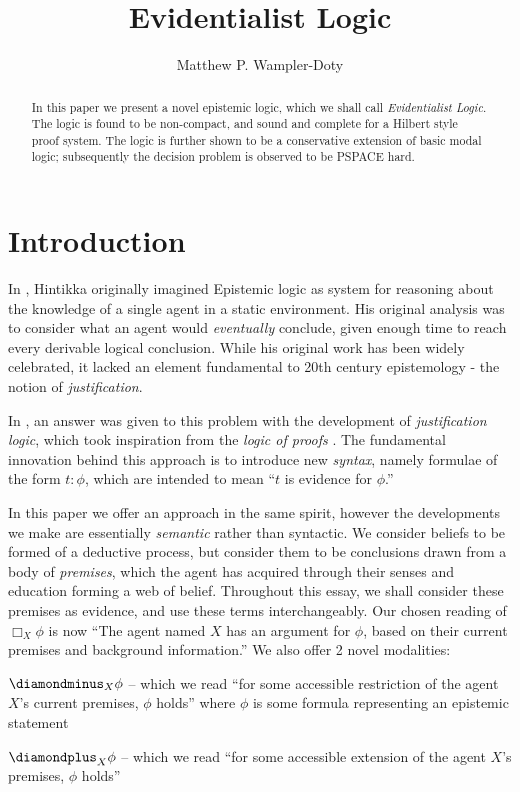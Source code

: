 \documentclass[11pt]{article}
\title{Evidentialist Logic}
\author{Matthew P. Wampler-Doty}
\date{}                                           %
\numberwithin{equation}{subsection}
\newcommand{\DD}{\diamondminus}
\newcommand{\DDI}{\diamondplus}
\newcommand{\Nec}{\Box}
\begin{document}
\maketitle
\begin{abstract} In this paper we present a novel epistemic logic, which we shall call \emph{Evidentialist Logic}.  The logic is found to be non-compact, and sound and complete for a Hilbert style proof system.  The logic is further shown to be a conservative extension of basic modal logic; subsequently the decision problem is observed to be \textsf{PSPACE} hard.  
\end{abstract}

\section{Introduction}

In \cite{hintikka1962kab}, Hintikka originally imagined Epistemic logic as system for reasoning about the knowledge of a single agent in a static environment.  His original analysis was to consider what an agent would \emph{eventually} conclude, given enough time to reach every derivable logical conclusion.  While his original work has been widely celebrated, it lacked an element fundamental to 20th century epistemology - the notion of \emph{justification}.

In \cite{artemov2005iji}, an answer was given to this problem with the development of \emph{justification logic}, which took inspiration from the \emph{logic of proofs} \citep{artemov1994lp}.  The fundamental innovation behind this approach is to introduce new \emph{syntax}, namely formulae of the form $t: \phi$, which are intended to mean ``$t$ is evidence for $\phi$.''

In this paper we offer an approach in the same spirit, however the developments we make are essentially \emph{semantic} rather than syntactic.  We consider beliefs to be formed of a deductive process, but consider them to be conclusions drawn from a body of \emph{premises}, which the agent has acquired through their senses and education forming a web of belief.  Throughout this essay, we shall consider these premises as evidence, and use these terms interchangeably.  Our chosen reading of $\Nec_X \phi$ is now ``The agent named $X$ has an argument for $\phi$, based on their current premises and background information.''  We also offer 2 novel modalities:
\begin{bul}
\item $\DD_X \phi$ -- which we read ``for some accessible restriction of the agent $X$'s current premises, $\phi$ holds'' where $\phi$ is some formula representing an epistemic statement
\item $\DDI_X \phi$ -- which we read ``for some accessible extension of the agent $X$'s premises, $\phi$ holds''
\end{bul}
\end{document}
